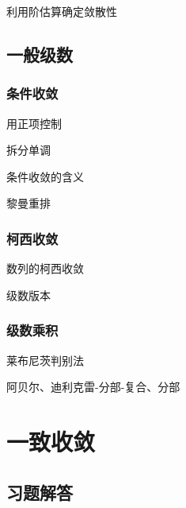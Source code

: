 \documentclass[a4paper,UTF8,fontset=windows,AutoFakeBold]{ctexart}
\theoremstyle{ex}
\begin{document}
利用阶估算确定敛散性

\subsection{一般级数}
\subsubsection{条件收敛}
用正项控制

拆分单调

条件收敛的含义

黎曼重排

\subsubsection{柯西收敛}
数列的柯西收敛

级数版本

\subsubsection{级数乘积}
莱布尼茨判别法

阿贝尔、迪利克雷-分部-复合、分部

\newpage
\section{一致收敛}
\subsection{习题解答}
\end{document}
